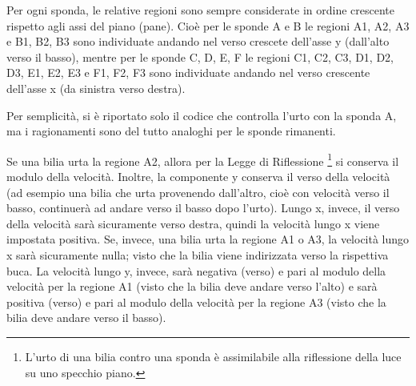 \documentclass[12pt,a4paper]{report}
\begin{document}
Per ogni sponda, le relative regioni sono sempre considerate in ordine crescente rispetto agli assi del piano (pane). Cioè per le sponde A e B le regioni A1, A2, A3 e B1, B2, B3 sono individuate andando nel verso crescete dell'asse y (dall'alto verso il basso), mentre per le sponde C, D, E, F le regioni C1, C2, C3, D1, D2, D3, E1, E2, E3 e F1, F2, F3 sono individuate andando nel verso crescente dell'asse x (da sinistra verso destra).

\vspace{3mm}

Per semplicità, si è riportato solo il codice che controlla l'urto con la sponda A, ma i ragionamenti sono del tutto analoghi per le sponde rimanenti.

\vspace{3mm}

Se una bilia urta la regione A2, allora per la Legge di Riflessione \footnote{L'urto di una bilia contro una sponda è assimilabile alla riflessione della luce su uno specchio piano.} si conserva il modulo della velocità.
Inoltre, la componente y conserva il verso della velocità (ad esempio una bilia che urta provenendo dall'altro, cioè con velocità verso il basso, continuerà ad andare verso il basso dopo l'urto).
Lungo x, invece, il verso della velocità sarà sicuramente verso destra, quindi la velocità lungo x viene impostata positiva.
Se, invece, una bilia urta la regione A1 o A3, la velocità lungo x sarà sicuramente nulla; visto che la bilia viene indirizzata verso la rispettiva buca.
La velocità lungo y, invece, sarà negativa (verso) e pari al modulo della velocità per la regione A1 (visto che la bilia deve andare verso l'alto) e sarà positiva (verso) e pari al modulo della velocità per la regione A3 (visto che la bilia deve andare verso il basso).

\pagebreak


\end{document}

